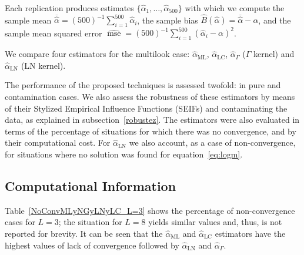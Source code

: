 \documentclass[twocolumn]{svjour3}
\begin{document}
Each replication produces estimates $\{\widehat{\alpha}_1, \dots, \widehat{\alpha}_{500}\}$ with which we compute 
the sample mean $\overline{\widehat{\alpha}}=(500)^{-1}{\sum_{i=1}^{500}{\widehat{\alpha}_i}}$, 
the sample bias $\widehat{B}(\widehat\alpha) = \overline{\widehat\alpha}- \alpha$, 
and 
the sample mean squared error $\widehat{\operatorname{mse}}=({500})^{-1}{\sum_{i=1}^{500}{(\widehat{\alpha}_i-\alpha)^2}}$.


We compare four estimators for the multilook case: 
$\widehat{\alpha}_{\text{{ML}}}$, 
$\widehat{\alpha}_{\text{{LC}}}$, 
$\widehat{\alpha}_{\Gamma}$ ($\Gamma$ kernel) and $\widehat{\alpha}_{\text{{LN}}}$ (LN kernel).

The performance of the proposed techniques is assessed twofold: in pure and contamination cases. 
We also assess the robustness of these estimators by means of their Stylized Empirical Influence Functions (SEIFs) and contaminating the data, as explained in subsection~\ref{robustez}. 
The estimators were also evaluated in terms of the percentage of situations for which there was no convergence, and by their computational cost. 
For $\widehat{\alpha}_{\text{{LN}}}$ we also account, as a case of non-convergence, for situations where no solution was found for equation~\eqref{eq:logm}.


\subsection{Computational Information}

Table~\ref{NoConvMLyNGyLNyLC_L=3} shows the percentage of non-convergence cases for $L=3$; the situation for $L=8$ yields similar values and, thus, is not reported for brevity.
It can be seen that the $\widehat{\alpha}_{\text{{ML}}}$ and $\widehat{\alpha}_{\text{{LC}}}$ estimators have the highest values of lack of convergence followed by  $\widehat{\alpha}_{\text{{LN}}}$ and $\widehat{\alpha}_{\Gamma}$.
\end{document}
